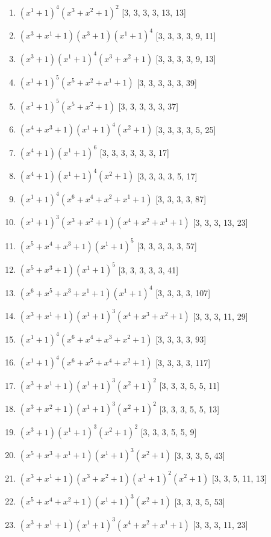 \documentclass[10pt,twocolumn]{article}
\begin{document}
\begin{enumerate}
\item $(x^{1} + 1)^{4}(x^{3} + x^{2} + 1)^{2}$  [3, 3, 3, 3, 13, 13]
\item $(x^{3} + x^{1} + 1)(x^{3} + 1)(x^{1} + 1)^{4}$  [3, 3, 3, 3, 9, 11]
\item $(x^{3} + 1)(x^{1} + 1)^{4}(x^{3} + x^{2} + 1)$  [3, 3, 3, 3, 9, 13]
\item $(x^{1} + 1)^{5}(x^{5} + x^{2} + x^{1} + 1)$  [3, 3, 3, 3, 3, 39]
\item $(x^{1} + 1)^{5}(x^{5} + x^{2} + 1)$  [3, 3, 3, 3, 3, 37]
\item $(x^{4} + x^{3} + 1)(x^{1} + 1)^{4}(x^{2} + 1)$  [3, 3, 3, 3, 5, 25]
\item $(x^{4} + 1)(x^{1} + 1)^{6}$  [3, 3, 3, 3, 3, 3, 17]
\item $(x^{4} + 1)(x^{1} + 1)^{4}(x^{2} + 1)$  [3, 3, 3, 3, 5, 17]
\item $(x^{1} + 1)^{4}(x^{6} + x^{4} + x^{2} + x^{1} + 1)$  [3, 3, 3, 3, 87]
\item $(x^{1} + 1)^{3}(x^{3} + x^{2} + 1)(x^{4} + x^{2} + x^{1} + 1)$  [3, 3, 3, 13, 23]
\item $(x^{5} + x^{4} + x^{3} + 1)(x^{1} + 1)^{5}$  [3, 3, 3, 3, 3, 57]
\item $(x^{5} + x^{3} + 1)(x^{1} + 1)^{5}$  [3, 3, 3, 3, 3, 41]
\item $(x^{6} + x^{5} + x^{3} + x^{1} + 1)(x^{1} + 1)^{4}$  [3, 3, 3, 3, 107]
\item $(x^{3} + x^{1} + 1)(x^{1} + 1)^{3}(x^{4} + x^{3} + x^{2} + 1)$  [3, 3, 3, 11, 29]
\item $(x^{1} + 1)^{4}(x^{6} + x^{4} + x^{3} + x^{2} + 1)$  [3, 3, 3, 3, 93]
\item $(x^{1} + 1)^{4}(x^{6} + x^{5} + x^{4} + x^{2} + 1)$  [3, 3, 3, 3, 117]
\item $(x^{3} + x^{1} + 1)(x^{1} + 1)^{3}(x^{2} + 1)^{2}$  [3, 3, 3, 5, 5, 11]
\item $(x^{3} + x^{2} + 1)(x^{1} + 1)^{3}(x^{2} + 1)^{2}$  [3, 3, 3, 5, 5, 13]
\item $(x^{3} + 1)(x^{1} + 1)^{3}(x^{2} + 1)^{2}$  [3, 3, 3, 5, 5, 9]
\item $(x^{5} + x^{3} + x^{1} + 1)(x^{1} + 1)^{3}(x^{2} + 1)$  [3, 3, 3, 5, 43]
\item $(x^{3} + x^{1} + 1)(x^{3} + x^{2} + 1)(x^{1} + 1)^{2}(x^{2} + 1)$  [3, 3, 5, 11, 13]
\item $(x^{5} + x^{4} + x^{2} + 1)(x^{1} + 1)^{3}(x^{2} + 1)$  [3, 3, 3, 5, 53]
\item $(x^{3} + x^{1} + 1)(x^{1} + 1)^{3}(x^{4} + x^{2} + x^{1} + 1)$  [3, 3, 3, 11, 23]

\end{enumerate}
\end{document}
